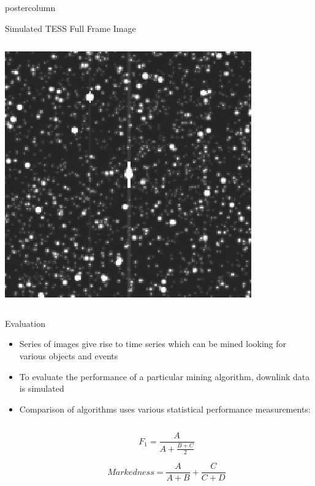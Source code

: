 \documentclass[final,hyperref={pdfpagelabels=false}]{beamer}
\begin{document}
\begin{frame}
\begin{columns}
\begin{column}{.49\textwidth}
\begin{beamercolorbox}[center,wd=\textwidth]{postercolumn}
\begin{minipage}[T]{.95\textwidth}
{\begin{block}{Simulated TESS Full Frame Image}
\begin{columns}
                \begin{column}{.38\textwidth}
                  \includegraphics[width=0.80\linewidth]{figures/ffi_simulation.jpg}
		\end{column}
	       \end{columns}
            \end{block}
            \vspace{1cm}
            \begin{block}{Evaluation}
            	\begin{itemize}
			\item Series of images give rise to time series which can be mined looking for various objects and events
			\item To evaluate the performance of a particular mining algorithm, downlink data is simulated 
			\item Comparison of algorithms uses various statistical performance measurements:
				\begin{columns}
                			\begin{column}{.60\textwidth}
			        $$ F_1 = \frac{A}{A + \frac{B + C}{2}} $$
			       
			       $$ Markedness = \frac{A}{A + B} + \frac{C}{C+D}$$
			       

\end{column}
\end{columns}
\end{itemize}
\end{block}}
\end{minipage}
\end{beamercolorbox}
\end{column}
\end{columns}
\end{frame}
\end{document}
